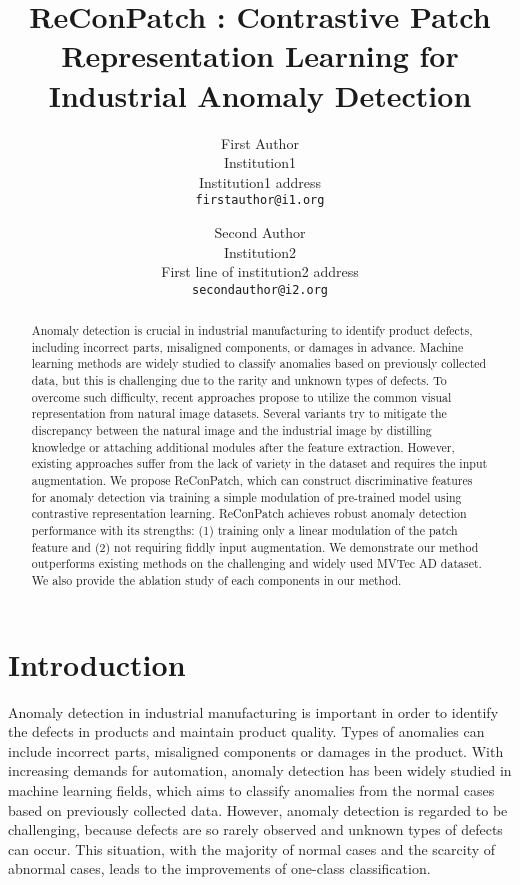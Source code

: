 \documentclass[10pt,onecolumn,letterpaper]{article}
\begin{document}
\title{ReConPatch : Contrastive Patch Representation Learning for Industrial Anomaly Detection}

\author{First Author\\
Institution1\\
Institution1 address\\
{\tt\small firstauthor@i1.org}
\and
Second Author\\
Institution2\\
First line of institution2 address\\
{\tt\small secondauthor@i2.org}
}




\begin{abstract}
Anomaly detection is crucial in industrial manufacturing to identify product defects, including incorrect parts, misaligned components, or damages in advance. Machine learning methods are widely studied to classify anomalies based on previously collected data, but this is challenging due to the rarity and unknown types of defects. To overcome such difficulty, recent approaches propose to utilize the common visual representation from natural image datasets. Several variants try to mitigate the discrepancy between the natural image and the industrial image by distilling knowledge or attaching additional modules after the feature extraction. 
However, existing approaches suffer from the lack of variety in the dataset and requires the input augmentation.  We propose ReConPatch, which can construct discriminative features for anomaly detection via training a simple modulation of pre-trained model using contrastive representation learning. ReConPatch achieves robust anomaly detection performance with its strengths: (1) training only a linear modulation of the patch feature and (2) not requiring fiddly input augmentation. We demonstrate our method outperforms existing methods on the challenging and widely used MVTec AD dataset. We also provide the ablation study of each components in our method.
\end{abstract}

\section{Introduction}
Anomaly detection in industrial manufacturing is important in order to identify the defects in products and maintain product quality. Types of anomalies can include incorrect parts, misaligned components or damages in the product. With increasing demands for automation, anomaly detection has been widely studied in machine learning fields, which aims to classify anomalies from the normal cases based on previously collected data. However, anomaly detection is regarded to be challenging, because defects are so rarely observed and unknown types of defects can occur. This situation, with the majority of normal cases and the scarcity of abnormal cases, leads to the improvements of one-class classification. 
\end{document}
